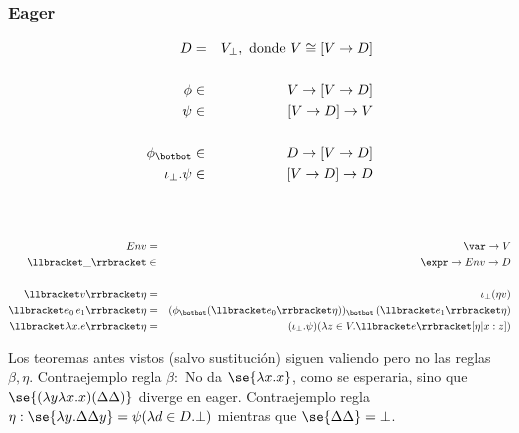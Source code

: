     \subsubsection{Eager}
      \begin{multicols}{2}
        \begin{eqnarray*}
          D &=& V_\bot, \text{ donde } V \cong [V \to D] \\ \\
          \phi &\in& V \to [V \to D] \\
          \psi &\in& [V \to D] \to V \\ \\
          \phi_{\botbot} &\in& D \to [V \to D] \\
          \iota_\bot . \psi &\in& [V \to D] \to D
        \end{eqnarray*}
        \begin{eqnarray*}
          \\ \\ \\
          Env &=& \var \to V \\
          \llbracket\_\rrbracket &\in& \expr \to Env \to D \\ \\
          \llbracket v\rrbracket\eta &=& \iota_\bot (\eta v) \\
          \llbracket e_0\, e_1\rrbracket\eta &=& (\phi_{\botbot} (\llbracket e_0\rrbracket\eta))_{\botbot}\, (\llbracket e_1\rrbracket\eta)\\
          \llbracket\lambda x.e\rrbracket\eta &=& (\iota_\bot . \psi)(\lambda z \in V. \llbracket e\rrbracket[\eta|x:z])
        \end{eqnarray*}
      \end{multicols}
      \PN Los teoremas antes vistos (salvo sustitución) siguen valiendo pero no las reglas $\beta, \eta$.
      \PN Contraejemplo regla $\beta:$ No da $\se{\lambda x. x}$, como se esperaria, sino que $\se{(\lambda y \lambda x.x)(\Delta \Delta)}$ diverge en eager.
      \PN Contraejemplo regla $\eta: \se{\lambda y. \Delta\Delta y} = \psi(\lambda d \in D.\bot)$ mientras que $\se{\Delta\Delta} = \bot$.
